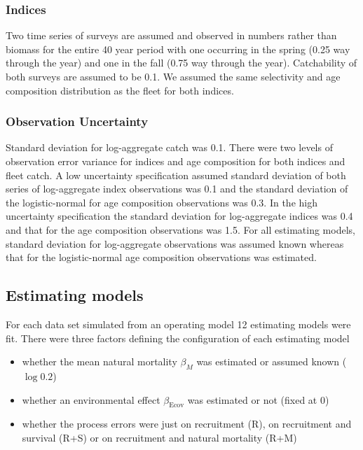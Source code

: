 \documentclass[
  12pt,
]{article}
\begin{document}
\hypertarget{indices}{%
\subsubsection*{Indices}\label{indices}}

Two time series of surveys are assumed and observed in numbers rather
than biomass for the entire 40 year period with one occurring in the
spring (0.25 way through the year) and one in the fall (0.75 way through
the year). Catchability of both surveys are assumed to be 0.1. We
assumed the same selectivity and age composition distribution as the
fleet for both indices.

\hypertarget{observation-uncertainty}{%
\subsubsection*{Observation Uncertainty}\label{observation-uncertainty}}

Standard deviation for log-aggregate catch was 0.1. There were two
levels of observation error variance for indices and age composition for
both indices and fleet catch. A low uncertainty specification assumed
standard deviation of both series of log-aggregate index observations
was 0.1 and the standard deviation of the logistic-normal for age
composition observations was 0.3. In the high uncertainty specification
the standard deviation for log-aggregate indices was 0.4 and that for
the age composition observations was 1.5. For all estimating models,
standard deviation for log-aggregate observations was assumed known
whereas that for the logistic-normal age composition observations was
estimated.

\hypertarget{estimating-models}{%
\subsection*{Estimating models}\label{estimating-models}}

For each data set simulated from an operating model 12 estimating models
were fit. There were three factors defining the configuration of each
estimating model

\begin{itemize}
\item whether the mean natural mortality $\beta_M$ was estimated or assumed known ($\log 0.2$)
\item whether an environmental effect $\beta_\text{Ecov}$ was estimated or not (fixed at 0)
\item whether the process errors were just on recruitment (R), on recruitment and survival (R+S) or on recruitment and natural mortality (R+M)
\end{itemize}
\end{document}
